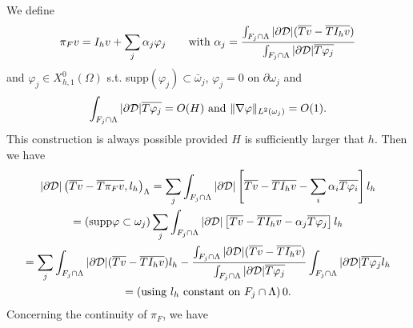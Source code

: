 We define
\begin{equation*}
\pi_F v = I_h v + \sum _j \alpha _j \varphi _j \qquad \text{with }\alpha_j =\frac{\int_{F_j \cap \Lambda}|\partial\mathcal{D}| (\overline{Tv}-\overline{TI_hv})}{\int_{F_j \cap \Lambda}|\partial\mathcal{D}|\overline{T\varphi _j}}
\end{equation*}
and $\varphi_j \in X_{h,1}^0(\Omega)$ s.t. supp$(\varphi_j)\subset \bar{\omega}_j$, $\varphi_j =0$ on $\partial \omega _j$ and 
\begin{equation*}
 \int_{F_j\cap \Lambda}|\partial\mathcal{D}|\overline{T\varphi_j}=O(H) \text{ and } \|\nabla \varphi\|_{L^2(\omega _j)}=O(1). 
\end{equation*}
This construction is always possible provided $H$ is sufficiently larger that $h$.
Then we have
\begin{multline*}
|\partial\mathcal{D}|\left(\overline{T v} - \overline{T \pi _F v}  , l _h\right)_{\Lambda} 
= \sum _j \int_{F_j\cap \Lambda} |\partial\mathcal{D} |\left[ \overline{Tv}-\overline{TI_hv}-\sum _i \alpha_i \overline{T\varphi _i} \right]l_h \\
=(\text{supp} \varphi \subset \omega_j) \sum _j \int_{F_j\cap \Lambda}|\partial\mathcal{D}| \left[ \overline{Tv}-\overline{TI_hv}-\alpha_j \overline{T\varphi _j} \right]l_h\\
=\sum _j \int_{F_j\cap \Lambda} |\partial\mathcal{D}| (\overline{Tv}-\overline{T I_h v}) l_h - \frac{\int_{F_j\cap \Lambda} |\partial\mathcal{D}| (\overline{Tv}-\overline{TI_hv})}{\int_{F_j\cap \Lambda}|\partial\mathcal{D}|\overline{T\varphi_j}} \int_{F_j\cap \Lambda} |\partial\mathcal{D}|\overline{T\varphi _j}l_h\\ 
=(\text{using $l_h$ constant on $F_j\cap \Lambda$})\,0.
\end{multline*}
Concerning the continuity of $\pi_F$, we have
